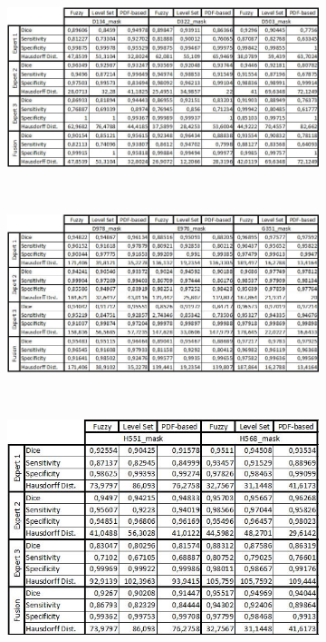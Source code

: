 \documentclass[a4paper, 10pt, conference]{ieeeconf}        %
\begin{document}
\begin{figure}[ht!]
 \begin{subfigure}{1.0\textwidth}
 \includegraphics[scale=0.8]{results_01.JPG}
 \end{subfigure}\\
 \begin{subfigure}{1\textwidth}
 \includegraphics[scale=0.8]{results_02.JPG}
 \end{subfigure}\\
 \begin{subfigure}{1\textwidth}
 \includegraphics[scale=0.8]{results_03.JPG}
 \end{subfigure} 
\end{figure}
\clearpage
\end{document}
